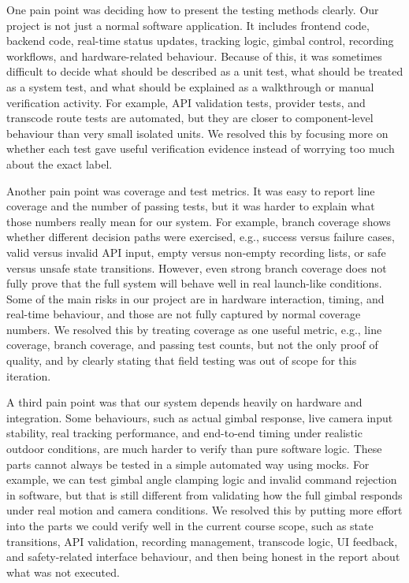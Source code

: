 \documentclass[12pt, titlepage]{article}
\begin{document}
\begin{enumerate}
        One pain point was deciding how to present the testing methods clearly. Our
        project is not just a normal software application. It includes frontend code,
        backend code, real-time status updates, tracking logic, gimbal control,
        recording workflows, and hardware-related behaviour. Because of this, it was
        sometimes difficult to decide what should be described as a unit test, what
        should be treated as a system test, and what should be explained as a
        walkthrough or manual verification activity. For example, API validation tests,
        provider tests, and transcode route tests are automated, but they are closer to
        component-level behaviour than very small isolated units. We resolved this by
        focusing more on whether each test gave useful verification evidence instead of
        worrying too much about the exact label.

        Another pain point was coverage and test metrics. It was easy to report line
        coverage and the number of passing tests, but it was harder to explain what
        those numbers really mean for our system. For example, branch coverage shows
        whether different decision paths were exercised, e.g., success versus failure
        cases, valid versus invalid API input, empty versus non-empty recording lists,
        or safe versus unsafe state transitions. However, even strong branch coverage
        does not fully prove that the full system will behave well in real launch-like
        conditions. Some of the main risks in our project are in hardware interaction,
        timing, and real-time behaviour, and those are not fully captured by normal
        coverage numbers. We resolved this by treating coverage as one useful metric,
        e.g., line coverage, branch coverage, and passing test counts, but not the only
        proof of quality, and by clearly stating that field testing was out of scope
        for this iteration.

        A third pain point was that our system depends heavily on hardware and
        integration. Some behaviours, such as actual gimbal response, live camera input
        stability, real tracking performance, and end-to-end timing under realistic
        outdoor conditions, are much harder to verify than pure software logic. These
        parts cannot always be tested in a simple automated way using mocks. For
        example, we can test gimbal angle clamping logic and invalid command rejection
        in software, but that is still different from validating how the full gimbal
        responds under real motion and camera conditions. We resolved this by putting
        more effort into the parts we could verify well in the current course scope,
        such as state transitions, API validation, recording management, transcode
        logic, UI feedback, and safety-related interface behaviour, and then being
        honest in the report about what was not executed.


\end{enumerate}
\end{document}
